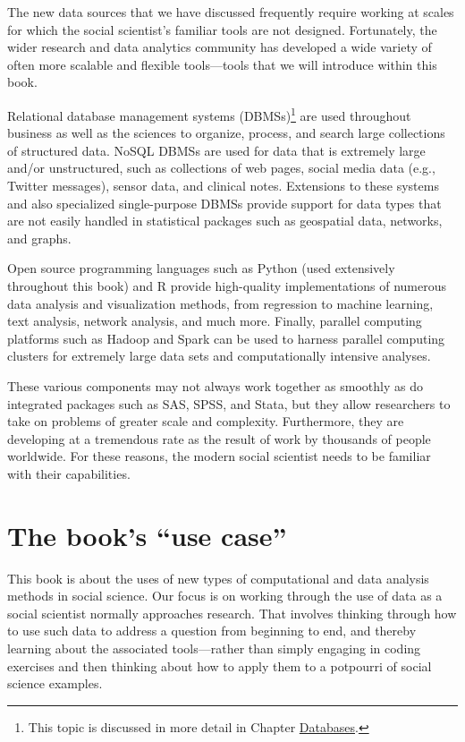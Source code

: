 \documentclass[]{krantz}
\begin{document}
The new data sources that we have discussed frequently require working
at scales for which the social scientist's familiar tools are not
designed. Fortunately, the wider research and data analytics community
has developed a wide variety of often more scalable and flexible
tools---tools that we will introduce within this book.

Relational database management systems (DBMSs)\footnote{This topic is
  discussed in more detail in Chapter
  \protect\hyperlink{chap:db}{Databases}.} are used throughout business
as well as the sciences to organize, process, and search large
collections of structured data. NoSQL DBMSs are used for data that is
extremely large and/or unstructured, such as collections of web pages,
social media data (e.g., Twitter messages), sensor data, and clinical
notes. Extensions to these systems and also specialized single-purpose
DBMSs provide support for data types that are not easily handled in
statistical packages such as geospatial data, networks, and graphs.

Open source programming languages such as Python (used extensively
throughout this book) and R provide high-quality implementations of
numerous data analysis and visualization methods, from regression to
machine learning, text analysis, network analysis, and much more.
Finally, parallel computing platforms such as Hadoop and Spark can be
used to harness parallel computing clusters for extremely large data
sets and computationally intensive analyses.

These various components may not always work together as smoothly as do
integrated packages such as SAS, SPSS, and Stata, but they allow
researchers to take on problems of greater scale and complexity.
Furthermore, they are developing at a tremendous rate as the result of
work by thousands of people worldwide. For these reasons, the modern
social scientist needs to be familiar with their capabilities.

\section{\texorpdfstring{The book's ``use
case''}{The book's use case}}\label{sec:1-6}

This book is about the uses of new types of computational and data
analysis methods in social science. Our focus is on working through the
use of data as a social scientist normally approaches research. That
involves thinking through how to use such data to address a question
from beginning to end, and thereby learning about the associated
tools---rather than simply engaging in coding exercises and then
thinking about how to apply them to a potpourri of social science
examples.
\end{document}
